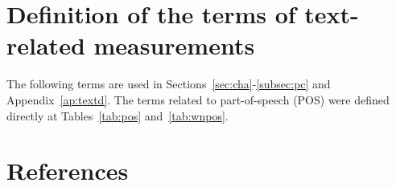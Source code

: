 \documentclass[review]{elsarticle}
\begin{document}
\section{Definition of the terms of text-related measurements}\label{ap:msTerms}
      The following terms are used in Sections~\ref{sec:cha}-\ref{subsec:pc} and Appendix~\ref{ap:textd}.
	The terms related to part-of-speech (POS) were defined directly at Tables~\ref{tab:pos} and~\ref{tab:wnpos}.


\section*{References}


\end{document}
